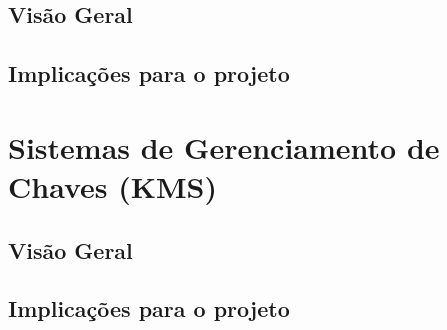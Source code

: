 \subsection{Visão Geral}

\subsection{Implicações para o projeto}


\section{Sistemas de Gerenciamento de Chaves (KMS)}

\subsection{Visão Geral}

\subsection{Implicações para o projeto}

